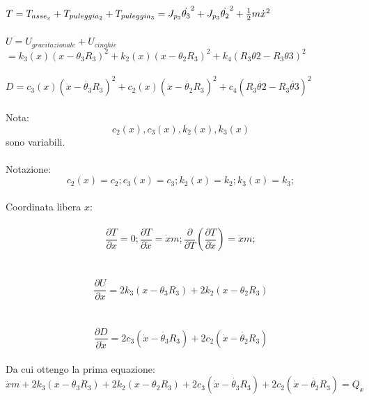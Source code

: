 \documentclass{article}
\begin{document}
$T = T_{asse_x} + T_{puleggia_2}+ T_{puleggia_3}
= J_{p_3}\dot{\theta_{3}}^{2}+ J_{p_3}\dot{\theta_{2}}^{2}+ {1 \over 2}m\dot{x}^{2} $
\\
\\
$U = U_{gravitazionale} + U_{cinghie} $
\\
$ =k_{3}(x)(x-\theta_{3}R_{3})^{2}+k_{2}(x)(x-\theta_{2}R_{3})^{2}+k_{4}(R_{3}\theta{2}-R_{3}\theta{3})^{2}$
\\
\\
$D =c_{3}(x)(\dot{x}-\dot{\theta_{3}}R_{3})^{2}+c_{2}(x)(\dot{x}-\dot{\theta_{2}}R_{3})^{2}+ c_{4}(R_{3}\dot{\theta{2}}-R_{3}\dot{\theta{3}})^{2}$
\\
\\
Nota: 
$$c_{2}(x), c_{3}(x),k_{2}(x), k_{3}(x)$$ sono variabili.
\\
\\
Notazione:
\begin{equation*}
c_{2}(x) = c_{2};
c_{3}(x) = c_{3};
k_{2}(x) = k_{2};
k_{3}(x) = k_{3};
\end{equation*}
\\
Coordinata libera $x$:
\\
\\
\begin{equation*}
\frac{ \partial T}{\partial x} = 0 ; \frac{\partial T}{\partial \dot{x}} = \dot{x}m;  \frac{\partial}{\partial T}(\frac{\partial T}{\partial \dot{x}})  = \ddot{x}m;
\end{equation*}
\\
\\
\begin{equation*}
\frac{\partial U}{\partial x} = 2k_3(x-\theta_3R_3) + 2k_2(x -\theta_2R_3)
\end{equation*}
\\
\\
\begin{equation*}
\frac{\partial D}{\partial \dot{x}} = 2c_3(\dot{x}-\dot{\theta_3}R_3) + 2c_2(\dot{x} -\dot{\theta_2}R_3)
\end{equation*}
\\
Da cui ottengo la prima equazione: 
\\
\begin{equation*}
 \ddot{x}m + 2k_{3}(x-\theta_{3}R_{3}) + 2k_{2}(x- \theta_{2}R_{3})+ 2c_{3}(\dot{x}-\dot{\theta_3}R_{3}) + 2c_{2}(\dot{x} - \dot{\theta_{2}}R_{3}) = Q_x
\end{equation*}
\end{document}
